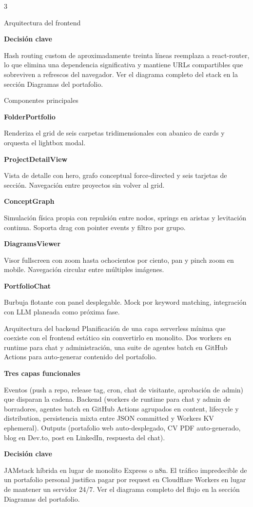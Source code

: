 \documentclass[10pt]{article}
\newcommand{\posterheading}[1]{%
  \vspace{4pt}%
  \par{\color{accentdark}\sffamily\bfseries #1}\par
  \vspace{2pt}%
}
\begin{document}
\begin{multicols}{3}
\begin{posterblock}{Arquitectura del frontend}
\posterheading{Decisión clave}
Hash routing custom de aproximadamente treinta líneas reemplaza a react-router, lo que elimina una dependencia significativa y mantiene URLs compartibles que sobreviven a refrescos del navegador. Ver el diagrama completo del stack en la sección Diagramas del portafolio.
\end{posterblock}

\begin{posterblock}{Componentes principales}
\posterheading{FolderPortfolio}
Renderiza el grid de seis carpetas tridimensionales con abanico de cards y orquesta el lightbox modal.

\posterheading{ProjectDetailView}
Vista de detalle con hero, grafo conceptual force-directed y seis tarjetas de sección. Navegación entre proyectos sin volver al grid.

\posterheading{ConceptGraph}
Simulación física propia con repulsión entre nodos, springs en aristas y levitación continua. Soporta drag con pointer events y filtro por grupo.

\posterheading{DiagramsViewer}
Visor fullscreen con zoom hasta ochocientos por ciento, pan y pinch zoom en mobile. Navegación circular entre múltiples imágenes.

\posterheading{PortfolioChat}
Burbuja flotante con panel desplegable. Mock por keyword matching, integración con LLM planeada como próxima fase.
\end{posterblock}


\begin{posterblock}{Arquitectura del backend}
Planificación de una capa serverless mínima que coexiste con el frontend estático sin convertirlo en monolito. Dos workers en runtime para chat y administración, una suite de agentes batch en GitHub Actions para auto-generar contenido del portafolio.

\posterheading{Tres capas funcionales}
Eventos (push a repo, release tag, cron, chat de visitante, aprobación de admin) que disparan la cadena. Backend (workers de runtime para chat y admin de borradores, agentes batch en GitHub Actions agrupados en content, lifecycle y distribution, persistencia mixta entre JSON committed y Workers KV ephemeral). Outputs (portafolio web auto-desplegado, CV PDF auto-generado, blog en Dev.to, post en LinkedIn, respuesta del chat).

\posterheading{Decisión clave}
JAMstack híbrida en lugar de monolito Express o n8n. El tráfico impredecible de un portafolio personal justifica pagar por request en Cloudflare Workers en lugar de mantener un servidor 24/7. Ver el diagrama completo del flujo en la sección Diagramas del portafolio.
\end{posterblock}


\end{multicols}
\end{document}
